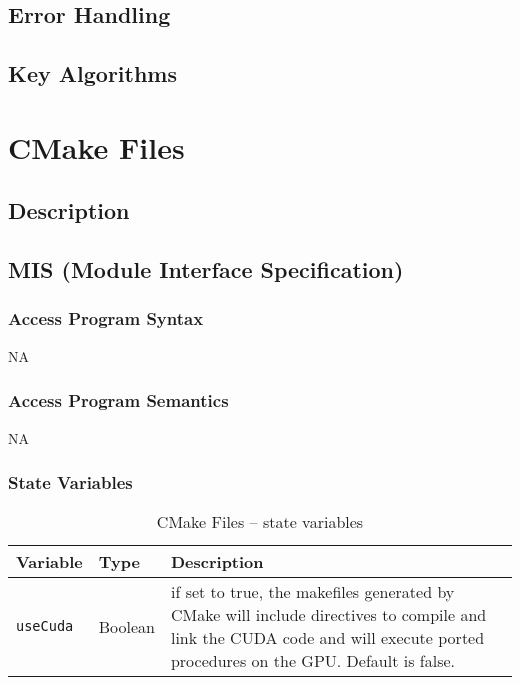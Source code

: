 \documentclass[12pt]{article}
\begin{document}
\subsection{Error Handling}

\subsection{Key Algorithms}

\section{CMake Files}
\subsection{Description}
\subsection{MIS (Module Interface Specification)}
\subsubsection{Access Program Syntax}%
NA

\subsubsection{Access Program Semantics}%
NA

\subsubsection{State Variables}%
\begin{table}[h]
\caption{CMake Files -- state variables}\label{Table_CMakeStateVariables}
\begin{tabularx}{\textwidth}{p{}p{}p{}}
\toprule
\bf Variable & \bf Type & \bf Description\\\midrule
\texttt{useCuda} & Boolean & if set to true, the makefiles generated by CMake will include directives to compile and link the CUDA code and will execute ported procedures on the GPU. Default is false.\\
\bottomrule
\end{tabularx}
\end{table}
\end{document}
